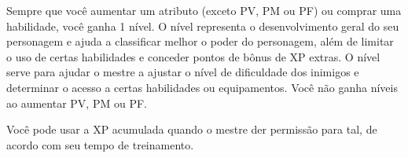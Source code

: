 

Sempre que você aumentar um atributo (exceto PV, PM ou PF) ou comprar uma habilidade, você ganha 1 nível. O nível representa o desenvolvimento geral do seu personagem e ajuda a classificar melhor o poder do personagem, além de limitar o uso de certas habilidades e conceder pontos de bônus de XP extras. O nível serve para ajudar o mestre a ajustar o nível de dificuldade dos inimigos e determinar o acesso a certas habilidades ou equipamentos. Você não ganha níveis ao aumentar PV, PM ou PF.

Você pode usar a XP acumulada quando o mestre der permissão para tal, de acordo com seu tempo de treinamento. 





